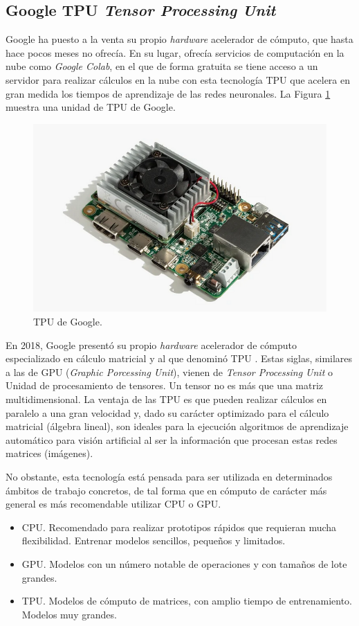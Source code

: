 \subsection{Google TPU \textit{Tensor Processing Unit}}

Google ha puesto a la venta su propio \textit{hardware} acelerador de cómputo, que hasta hace pocos meses no ofrecía. En su lugar, ofrecía servicios de computación en la nube como \textit{Google Colab}, en el que de forma gratuita se tiene acceso a un servidor para realizar cálculos en la nube con esta tecnología TPU que acelera en gran medida los tiempos de aprendizaje de las redes neuronales. La Figura \ref{fig:tpu} muestra una unidad de TPU de Google.

\begin{figure}[htp]
    \centering
    \captionsetup{justification=centering}
    \includegraphics[width=.5\textwidth]{img/tpu.PNG}\hfill
    \caption{TPU de Google.}
    \label{fig:tpu}
\end{figure}

En 2018, Google presentó su propio \textit{hardware} acelerador de cómputo especializado en cálculo matricial y al que denominó TPU \cite{tpu}. Estas siglas, similares a las de GPU (\textit{Graphic Porcessing Unit}), vienen de \textit{Tensor Processing Unit} o Unidad de procesamiento de tensores. Un tensor no es más que una matriz multidimensional. La ventaja de las TPU es que pueden realizar cálculos en paralelo a una gran velocidad y, dado su carácter optimizado para el cálculo matricial (álgebra lineal), son ideales para la ejecución algoritmos de aprendizaje automático para visión artificial al ser la información que procesan estas redes matrices (imágenes).

No obstante, esta tecnología está pensada para ser utilizada en determinados ámbitos de trabajo concretos, de tal forma que en cómputo de carácter más general es más recomendable utilizar CPU o GPU.

\begin{itemize}
    \item CPU. Recomendado para realizar prototipos rápidos que requieran mucha flexibilidad. Entrenar modelos sencillos, pequeños y limitados.
    \item GPU. Modelos con un número notable de operaciones y con tamaños de lote grandes.
    \item TPU. Modelos de cómputo de matrices, con amplio tiempo de entrenamiento. Modelos muy grandes.
\end{itemize}

